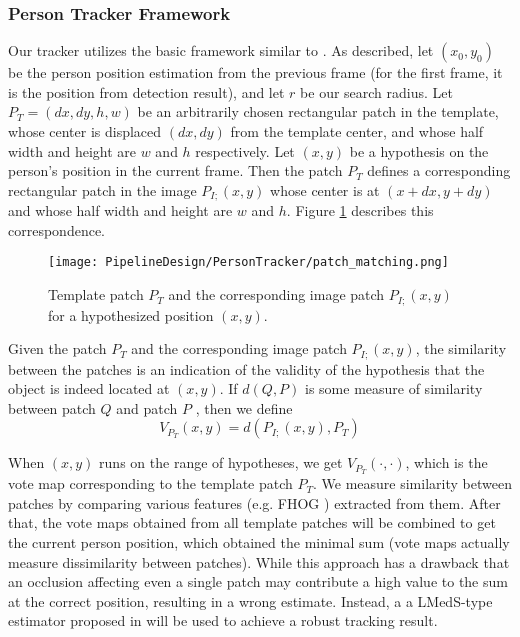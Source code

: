 \subsubsection{Person Tracker Framework}

Our tracker utilizes the basic framework similar to \cite{adam2006}. As described, let $(x_{0}, y_{0})$ be the person position estimation from the previous frame (for the first frame, it is the position from detection result), and let $r$ be our search radius. Let $P_{T} = (dx, dy, h, w)$ be an arbitrarily chosen rectangular patch in the template, whose center is displaced $(dx, dy)$ from the template center, and whose half width and height are $w$ and $h$ respectively. Let $(x, y)$ be a hypothesis on the person’s position in the current frame. Then the patch $P_{T}$ defines a corresponding rectangular patch in the image $P_{I;}(x,y)$ whose center is at $(x + dx, y + dy)$ and whose half width and height are $w$ and $h$. Figure \ref{fig:patch_matching} describes this correspondence.

\begin{figure}[h!]
  \centering
  \texttt{[image: PipelineDesign/PersonTracker/patch\_matching.png]}
  \caption{Template patch $P_{T}$ and the corresponding image patch $P_{I;}(x,y)$ for a hypothesized
           position $(x, y)$. \cite{adam2006}}
  \label{fig:patch_matching}
\end{figure} 

Given the patch $P_{T}$ and the corresponding image patch $P_{I;}(x,y)$, the similarity between the patches is an indication of the validity of the hypothesis that the object is indeed located at $(x, y)$. If $d(Q, P)$ is some measure of similarity between patch $Q$ and patch $P$ , then we define 
\begin{equation}
V_{P_{T}}(x,y) = d(P_{I;}(x,y), P_{T})
\end{equation}

When $(x, y)$ runs on the range of hypotheses, we get $V_{P_{T}}(·,·)$, which is the vote map corresponding to the template patch $P_{T}$. We measure similarity between patches by comparing various features (e.g. FHOG \cite{Felz2010}) extracted from them. After that, the vote maps obtained from all template patches will be combined to get the current person position, which obtained the minimal sum (vote maps actually measure dissimilarity between patches). While this approach has a drawback that an occlusion affecting even a single patch may contribute a high value to the sum at the correct position, resulting in a wrong estimate. Instead, a a LMedS-type estimator proposed in \cite{adam2006} will be used to achieve a robust tracking result. 

